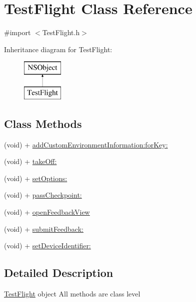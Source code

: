 \hypertarget{interface_test_flight}{\section{Test\-Flight Class Reference}
\label{interface_test_flight}
}


{\ttfamily \#import $<$Test\-Flight.\-h$>$}

Inheritance diagram for Test\-Flight\-:\begin{figure}[H]
\begin{center}
\leavevmode
\includegraphics[height=2.000000cm]{interface_test_flight}
\end{center}
\end{figure}
\subsection*{Class Methods}
\begin{DoxyCompactItemize}
\item 
(void) + \hyperlink{interface_test_flight_a03922e1d4f8860fea67219f23397d9e2}{add\-Custom\-Environment\-Information\-:for\-Key\-:}
\item 
(void) + \hyperlink{interface_test_flight_adc50b15219724a73019464acf2ded651}{take\-Off\-:}
\item 
(void) + \hyperlink{interface_test_flight_aeab53bbf35f81495258709461070db7a}{set\-Options\-:}
\item 
(void) + \hyperlink{interface_test_flight_aa28c2468cdd8d8ba3a1f363f98bd292f}{pass\-Checkpoint\-:}
\item 
(void) + \hyperlink{interface_test_flight_a30045419140b0039ccb55ab6c1c39c9c}{open\-Feedback\-View}
\item 
(void) + \hyperlink{interface_test_flight_a672f3f6f97f61fce42980f75f8a955c9}{submit\-Feedback\-:}
\item 
(void) + \hyperlink{interface_test_flight_acc85f4afac29e1f5087eb9606f011411}{set\-Device\-Identifier\-:}
\end{DoxyCompactItemize}


\subsection{Detailed Description}
\hyperlink{interface_test_flight}{Test\-Flight} object All methods are class level 

